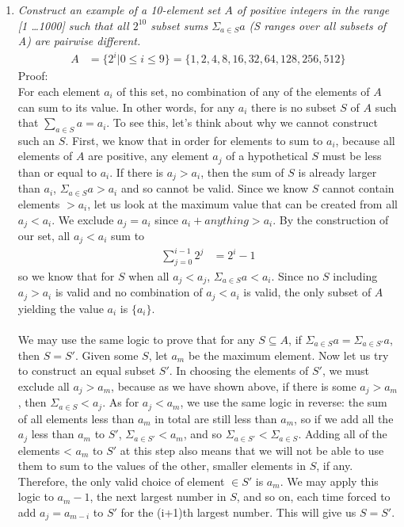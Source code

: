 \documentclass[12pt]{article}
\begin{document}
\begin{enumerate}
\item \emph{Construct an example of a 10-element set $A$ of positive integers in the range [1 \dots 1000] such that all $2^{10}$ subset sums $\Sigma_{a\in S} a$ (S ranges over all subsets of A) are pairwise different.} \\
\begin{align}
\nonumber A&=\{2^i|0\leq i \leq 9\} = \{1, 2, 4, 8, 16, 32, 64, 128, 256, 512\}
\end{align}
Proof: \\
For each element $a_i$ of this set, no combination of any of the elements of $A$ can sum to its value. In other words, for any $a_i$ there is no subset $S$ of $A$ such that $\sum\limits_{a\in S} a = a_i$. To see this, let's think about why we cannot construct such an $S$. First, we know that in order for elements to sum to $a_i$, because all elements of $A$ are positive, any element $a_j$ of a hypothetical $S$ must be less than or equal to $a_i$. If there is $a_j > a_i$, then the sum of $S$ is already larger than $a_i$, $\Sigma_{a\in S} a > a_i$ and so cannot be valid. Since we know $S$ cannot contain elements $> a_i$, let us look at the maximum value that can be created from all $a_j < a_i$. We exclude $a_j = a_i$ since $a_i + anything > a_i$. By the construction of our set, all $a_j < a_i$ sum to
\begin{align}
\nonumber\sum\limits_{j=0}^{i-1} 2^j &= 2^i-1
\end{align}
so we know that for $S$ when all $a_j < a_j$, $\Sigma_{a\in S} a < a_i$. Since no $S$ including $a_j > a_i$ is valid and no combination of $a_j < a_i$ is valid, the only subset of $A$ yielding the value $a_i$ is $\{a_i\}$. \\
\\
We may use the same logic to prove that for any $S \subseteq A$, if $\Sigma_{a\in S} a = \Sigma_{a\in S'} a$, then $S = S'$. Given some $S$, let $a_m$ be the maximum element. Now let us try to construct an equal subset $S'$. In choosing the elements of $S'$, we must exclude all $a_j > a_m$, because as we have shown above, if there is some $a_j > a_m$, then $\Sigma_{a\in S} < a_j$. As for $a_j < a_m$, we use the same logic in reverse: the sum of all elements less than $a_m$ in total are still less than $a_m$, so if we add all the $a_j$ less than $a_m$ to $S'$, $\Sigma_{a\in S'} < a_m$, and so $\Sigma_{a\in S'} < \Sigma_{a\in S}$. Adding all of the elements < $a_m$ to $S'$ at this step also means that we will not be able to use them to sum to the values of the other, smaller elements in $S$, if any. Therefore, the only valid choice of element $\in S'$ is $a_m$. We may apply this logic to $a_m-1$, the next largest number in $S$, and so on, each time forced to add $a_j = a_{m-i}$ to $S'$ for the (i+1)th largest number. This will give us $S = S'$.\\
\\


\end{enumerate}
\end{document}
